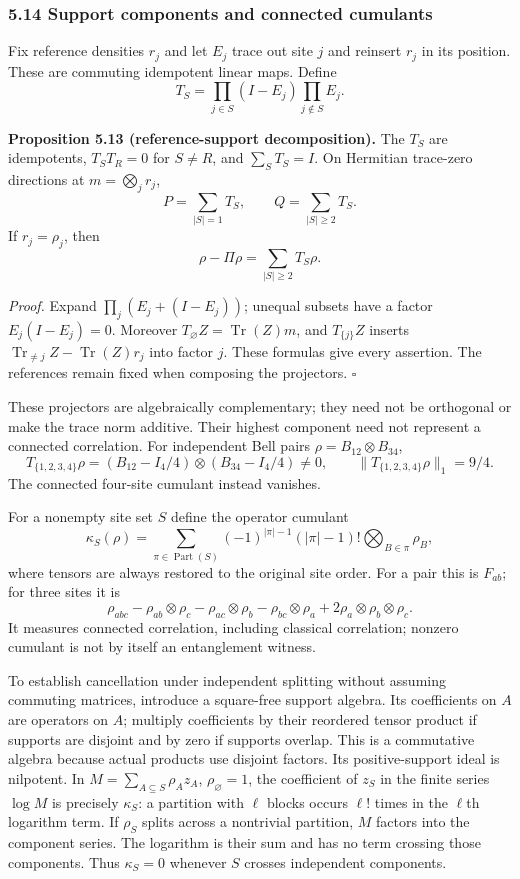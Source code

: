 \documentclass[
  11pt,
]{article}
\begin{document}
\subsubsection{5.14 Support components and connected cumulants}\label{support-components-and-connected-cumulants}

Fix reference densities \(r_j\) and let \(E_j\) trace out site \(j\) and reinsert
\(r_j\) in its position. These are commuting idempotent linear maps. Define
\[
T_S=\prod_{j\in S}(I-E_j)\prod_{j\notin S}E_j.
\]

\textbf{Proposition 5.13 (reference-support decomposition).} The \(T_S\) are
idempotents, \(T_ST_R=0\) for \(S\ne R\), and \(\sum_ST_S=I\). On Hermitian
trace-zero directions at \(m=\bigotimes_jr_j\),
\[
P=\sum_{|S|=1}T_S,\qquad Q=\sum_{|S|\ge2}T_S.
\]
If \(r_j=\rho_j\), then
\[
\rho-\Pi\rho=\sum_{|S|\ge2}T_S\rho.
\]

\emph{Proof.} Expand \(\prod_j(E_j+(I-E_j))\); unequal subsets have a factor
\(E_j(I-E_j)=0\). Moreover \(T_\varnothing Z=\operatorname{Tr}(Z)m\), and
\(T_{\{j\}}Z\) inserts
\(\operatorname{Tr}_{\ne j}Z-\operatorname{Tr}(Z)r_j\) into factor \(j\).
These formulas give every assertion. The references remain fixed when
composing the projectors. \(\square\)

These projectors are algebraically complementary; they need not be orthogonal
or make the trace norm additive. Their highest component need not represent a
connected correlation. For independent Bell pairs
\(\rho=B_{12}\otimes B_{34}\),
\[
T_{\{1,2,3,4\}}\rho=(B_{12}-I_4/4)\otimes(B_{34}-I_4/4)\ne0,
\qquad \lVert T_{\{1,2,3,4\}}\rho\rVert_1=9/4.
\]
The connected four-site cumulant instead vanishes.

For a nonempty site set \(S\) define the operator cumulant
\[
\kappa_S(\rho)=\sum_{\pi\in\operatorname{Part}(S)}
       (-1)^{|\pi|-1}(|\pi|-1)!\bigotimes_{B\in\pi}\rho_B,
\]
where tensors are always restored to the original site order. For a pair
this is \(F_{ab}\); for three sites it is
\[
\rho_{abc}-\rho_{ab}\otimes\rho_c-\rho_{ac}\otimes\rho_b
-\rho_{bc}\otimes\rho_a+2\rho_a\otimes\rho_b\otimes\rho_c.
\]
It measures connected correlation, including classical correlation; nonzero
cumulant is not by itself an entanglement witness.

To establish cancellation under independent splitting without assuming commuting
matrices, introduce a square-free support algebra. Its coefficients on \(A\)
are operators on \(A\); multiply coefficients by their reordered tensor product
if supports are disjoint and by zero if supports overlap. This is a commutative
algebra because actual products use disjoint factors. Its positive-support
ideal is nilpotent. In
\(M=\sum_{A\subseteq S}\rho_Az_A\), \(\rho_\varnothing=1\), the coefficient
of \(z_S\) in the finite series \(\log M\) is precisely \(\kappa_S\): a partition
with \(\ell\) blocks occurs \(\ell!\) times in the \(\ell\)th logarithm term.
If \(\rho_S\) splits across a nontrivial partition, \(M\) factors into the
component series. The logarithm is their sum and has no term crossing those
components. Thus \(\kappa_S=0\) whenever \(S\) crosses independent components.
\end{document}
